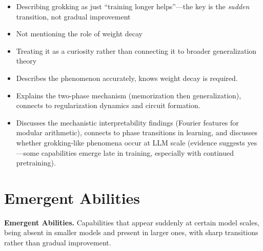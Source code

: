 \begin{interviewq}
\redflags
\begin{itemize}
    \item Describing grokking as just ``training longer helps''---the key is the \textit{sudden} transition, not gradual improvement
    \item Not mentioning the role of weight decay
    \item Treating it as a curiosity rather than connecting it to broader generalization theory
\end{itemize}


\goodgreat
\begin{itemize}
    \item {} Describes the phenomenon accurately, knows weight decay is required.
    \item {} Explains the two-phase mechanism (memorization then generalization), connects to regularization dynamics and circuit formation.
    \item {} Discusses the mechanistic interpretability findings (Fourier features for modular arithmetic), connects to phase transitions in learning, and discusses whether grokking-like phenomena occur at LLM scale (evidence suggests yes---some capabilities emerge late in training, especially with continued pretraining).
\end{itemize}

\end{interviewq}

\section{Emergent Abilities}
\label{sec:emergent}

\textbf{Emergent Abilities.} Capabilities that appear suddenly at certain model scales, being absent in smaller models and present in larger ones, with sharp transitions rather than gradual improvement.

